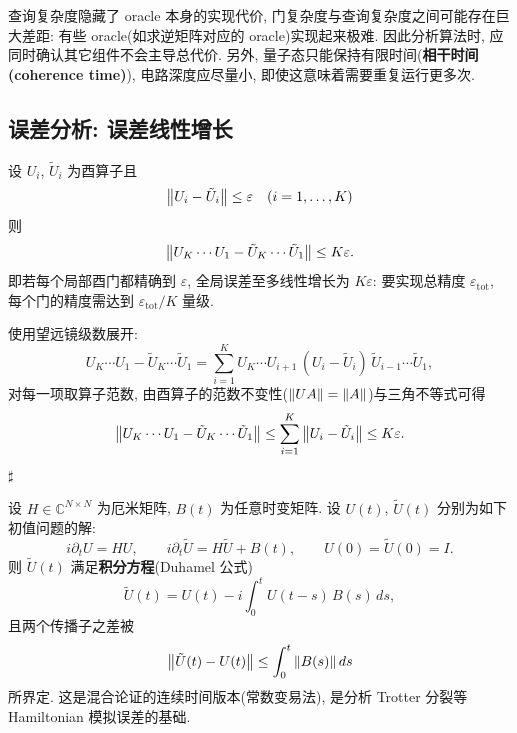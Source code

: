 \documentclass[utf8]{article} %
\numberwithin{equation}{section}   %
\newtheorem{Prop}{\hskip 2em {\color{cyan} 命题}}[subsection]
\newtheorem{Note}{\hskip 2em {\color{red} 注}}[subsection]
\newenvironment{Proof}{{\noindent\it Proof:}\quad}{\hfill $\sharp $\par}
\begin{document}
\begin{Note}
    查询复杂度隐藏了 oracle 本身的实现代价, 门复杂度与查询复杂度之间可能存在巨大差距:
    有些 oracle(如求逆矩阵对应的 oracle)实现起来极难.
    因此分析算法时, 应同时确认其它组件不会主导总代价.
    另外, 量子态只能保持有限时间(\textbf{相干时间(coherence time)}), 电路深度应尽量小, 即使这意味着需要重复运行更多次.
\end{Note}

\subsection{误差分析: 误差线性增长}

\begin{Prop}[酉矩阵乘积的线性误差增长]
    设 $U_i$, $\tilde U_i$ 为酉算子且 
    $$\norm{U_i - \tilde U_i} \le \varepsilon\quad (i = 1, \dots, K)$$
    则
    \begin{equation}
        \norm{U_K\cdots U_1 - \tilde U_K \cdots \tilde U_1} \le K \varepsilon.
    \end{equation}
    即若每个局部酉门都精确到 $\varepsilon$, 全局误差至多线性增长为 $K\varepsilon$:
    要实现总精度 $\varepsilon_{\mathrm{tot}}$, 每个门的精度需达到 $\varepsilon_{\mathrm{tot}}/K$ 量级.
\end{Prop}

\begin{Proof}
    使用望远镜级数展开:
    \begin{equation*}
        U_K\cdots U_1 - \tilde U_K\cdots\tilde U_1
        = \sum_{i=1}^{K} U_K\cdots U_{i+1}\, (U_i - \tilde U_i)\, \tilde U_{i-1}\cdots \tilde U_1,
    \end{equation*}
    对每一项取算子范数, 由酉算子的范数不变性($\norm{U A} = \norm{A}$)与三角不等式可得
    \[ \norm{U_K\cdots U_1 - \tilde U_K\cdots\tilde U_1} \le \sum_{i=1}^{K} \norm{U_i-\tilde U_i} \le K\varepsilon. \]
\end{Proof}

\begin{Prop}
    设 $H \in \mathbb{C}^{N\times N}$ 为厄米矩阵, $B(t)$ 为任意时变矩阵. 设 $U(t)$, $\tilde U(t)$
    分别为如下初值问题的解:
    \begin{equation}
        i\partial_t U = HU, \qquad i\partial_t \tilde U = H\tilde U + B(t), \qquad U(0) = \tilde U(0) = I.
    \end{equation}
    则 $\tilde U(t)$ 满足\textbf{积分方程}(Duhamel 公式)
    \begin{equation}
        \tilde U(t) = U(t) - i \int_0^t U(t-s)\, B(s)\, ds,
    \end{equation}
    且两个传播子之差被
    \begin{equation}
        \norm{\tilde U(t) - U(t)} \le \int_0^t \norm{B(s)}\, ds
    \end{equation}
    所界定. 这是混合论证的连续时间版本(常数变易法), 是分析 Trotter 分裂等 Hamiltonian 模拟误差的基础.
\end{Prop}
\end{document}
